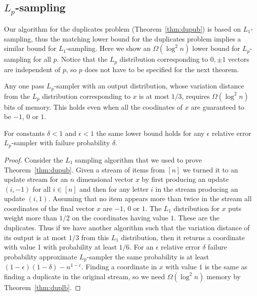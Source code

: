 \subsection{$L_p$-sampling}
Our algorithm for the duplicates problem (Theorem~\ref{thm:dupub}) is based on
$L_1$-sampling, thus the matching lower bound for the duplicates problem
implies a similar bound for $L_1$-sampling. Here we show an $\Omega(\log^2 n)$ lower bound for $L_p$-sampling for all $p$.
 Notice that the $L_p$ distribution corresponding to $0,\pm1$
vectors are independent of $p$, so $p$ does not have to be specified for the
next theorem.

\begin{theorem}\label{lpl}
Any one pass
$L_p$-sampler with an output distribution,
whose variation distance from the $L_p$ distribution corresponding to $x$ is
at most $1/3$, requires $\Omega(\log^2n)$ bits of memory. This holds even
when all the coodinates of $x$
are
guaranteed to be $-1$, $0$ or $1$.

For constants $\delta<1$ and $\epsilon<1$ the same lower bound holds for any
$\epsilon$ relative error $L_p$-sampler with failure probability $\delta$.
\end{theorem}

\begin{proof}
Consider the $L_1$ sampling algorithm that we used to prove
Theorem~\ref{thm:dupub}. Given a stream of items from $[n]$ we turned it to
an update stream for an $n$ dimensional vector $x$ by first
producing an update $(i,-1)$ for all $i\in[n]$ and then for any letter $i$ in
the stream producing an update $(i,1)$. Assuming that no item appears more
than twice in the stream all coordinates of the final vector $x$ are $-1$, $0$
or $1$. The $L_1$ distribution for $x$ puts weight more than $1/2$ on the
coordinates having value $1$. These are the duplicates. Thus if we have
another algorithm such that the variation distance of its output is at most
$1/3$ from this $L_1$ distribution, then it returns a coordinate with value 1
with probability at least $1/6$. For an $\epsilon$ relative error $\delta$
failure probability approximate $L_p$-sampler the same probability is at least
$(1-\epsilon)(1-\delta)-n^{1-c}$. Finding a coordinate in $x$ with value $1$
is the same as finding a duplicate in the original stream, so we need
$\Omega(\log^2n)$ memory by Theorem~\ref{thm:duplb}.
\end{proof}



